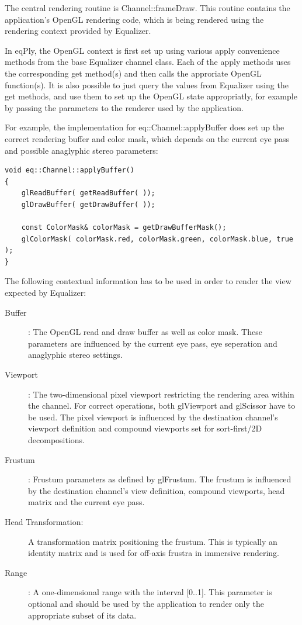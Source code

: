\documentclass[10pt,a4]{scrartcl}
\begin{document}
The central rendering routine is \textsf{Channel::frameDraw}. This
routine contains the application's OpenGL rendering code, which is being
rendered using the rendering context provided by Equalizer. 

In \textsf{eqPly}, the OpenGL context is first set up using various
\textsf{apply} convenience methods from the base Equalizer channel
class. Each of the \textsf{apply} methods uses the corresponding
\textsf{get} method(s) and then calls the approriate OpenGL
function(s). It is also possible to just query the values from Equalizer
using the \textsf{get} methods, and use them to set up the OpenGL state
appropriatly, for example by passing the parameters to the renderer used
by the application.

For example, the implementation for \textsf{eq::Channel::applyBuffer}
does set up the correct rendering buffer and color mask, which depends
on the current eye pass and possible anaglyphic stereo parameters:

{\footnotesize\begin{lstlisting}
void eq::Channel::applyBuffer()
{
    glReadBuffer( getReadBuffer( ));
    glDrawBuffer( getDrawBuffer( ));
    
    const ColorMask& colorMask = getDrawBufferMask();
    glColorMask( colorMask.red, colorMask.green, colorMask.blue, true );
}
\end{lstlisting}}

The following contextual information has to be used in order to render
the view expected by Equalizer:
\begin{description}
\item[Buffer]: The OpenGL read and draw buffer as well as color mask.
  These parameters are influenced by the current eye pass, eye
  seperation and anaglyphic stereo settings.
\item[Viewport]: The two-dimensional pixel viewport restricting the
  rendering area within the channel. For correct operations, both
  \textsf{glViewport} and \textsf{glScissor} have to be used. The pixel
  viewport is influenced by the destination channel's viewport
  definition and compound viewports set for sort-first/2D decompositions.
\item[Frustum]: Frustum parameters as defined by
  \textsf{glFrustum}. The frustum is influenced by the destination
  channel's view definition, compound viewports, head matrix and the
  current eye pass.
\item[Head Transformation:] A transformation matrix positioning the
  frustum. This is typically an identity matrix and is used for off-axis
  frustra in immersive rendering.
\item[Range]: A one-dimensional range with the interval [0..1]. This
  parameter is optional and should be used by the application to render
  only the appropriate subset of its data.
\end{description}
\end{document}
